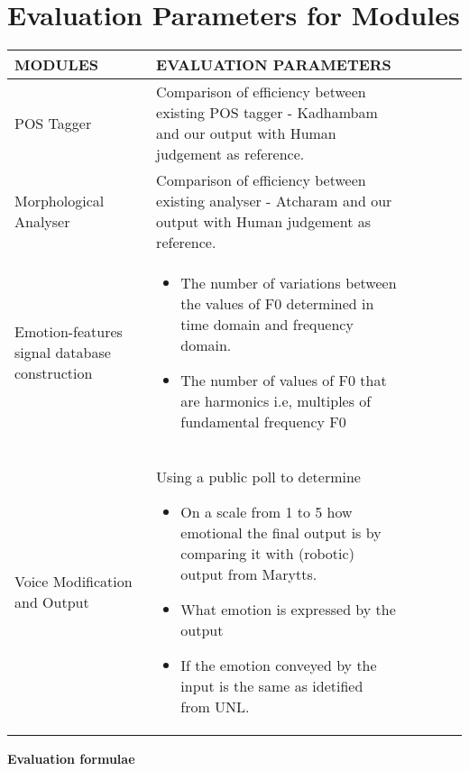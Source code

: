 \documentclass{article}
\begin{document}
\section{Evaluation Parameters for Modules}\large
\begin{center}
\begin{tabularx}{\linewidth}{|@{}lYYYYY@{}|}
\hline
MODULES & EVALUATION PARAMETERS \\ 
\hline\hline
	POS Tagger &  Comparison of efficiency between existing POS tagger - Kadhambam  and our output with Human judgement as reference.\\
\hline
Morphological Analyser &  Comparison of efficiency between existing analyser - Atcharam and our output with Human judgement as reference.\\
\hline
	Emotion-features signal database construction
& \begin{itemize}
\item The number of variations between the values of F0 determined in time domain and frequency domain.
\item The number of values of F0 that are harmonics i.e, multiples of fundamental frequency F0
\end{itemize}\\
\hline
	Voice Modification and Output & Using a public poll to determine
\begin{itemize}
\item  On a scale from 1 to 5 how emotional the final output is by comparing it with (robotic) output from Marytts.
\item What emotion is expressed by the output 
\item If the emotion conveyed by the input is the same as idetified from UNL.
\end{itemize}\\
\hline
\end {tabularx}
\end{center}
\textbf{Evaluation formulae} 
\end{document}
